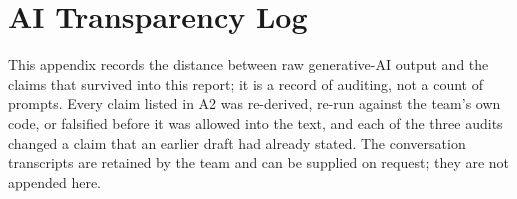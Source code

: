 %
%
%     
%

\ifdefined\reportbuild
  \newcommand{\reftext}[2]{#1}
\else
  \newcommand{\reftext}[2]{#2}
\fi

\section{AI Transparency Log}
\label{app:ai_log}

This appendix records the distance between raw generative-AI output and the
claims that survived into this report; it is a record of auditing, not a count
of prompts. Every claim listed in A2 was re-derived, re-run against the team's
own code, or falsified before it was allowed into the text, and each of the
three audits changed a claim that an earlier draft had already stated. The
conversation transcripts are retained by the team and can be supplied on
request; they are not appended here.

